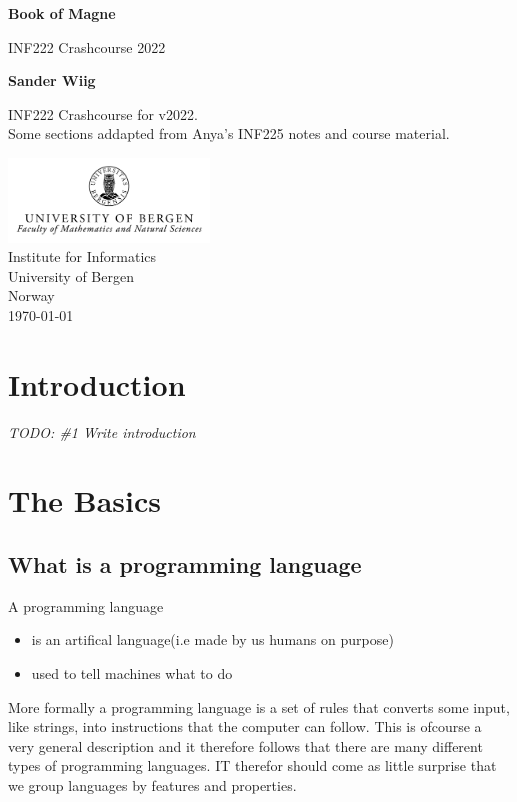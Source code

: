 \documentclass{article}
\DeclareRobustCommand{\comment}[1]{
    {\color{orange}\emph{#1}}
}
\begin{document}
    \begin{titlepage}
        \begin{center}
            \vspace*{1cm}
    
            \huge
            \textbf{Book of Magne}
    
            \vspace{0.5cm}
            \LARGE
            INF222 Crashcourse 2022
                
            \vspace{1.5cm}

            \textbf{Sander Wiig}
    
            \vfill
            
            \Large
            INF222 Crashcourse for v2022.\\
            Some sections addapted from Anya's INF225 notes and course material.
                
            \vspace{0.5cm}
        
            \includegraphics[width=0.4\textwidth]{UiBlogoMN_gray_m_Eng.png}\\
            \Large
            Institute for Informatics\\
            University of Bergen\\
            Norway\\
            \today
                
        \end{center}
    \end{titlepage}
    \newpage
    \tableofcontents
    \newpage
    \section{Introduction}
    \comment{TODO: \#1 Write introduction}
    \section{The Basics}
    \subsection{What is a programming language}
        A programming language 
        \begin{itemize}
            \item is an artifical language(i.e made by us humans on purpose)
            \item used to tell machines what to do
        \end{itemize}
        More formally a programming language is a set of rules that converts some input, like strings, into instructions that the computer 
        can follow.
        This is ofcourse a very general description and it therefore follows that there are many different types of programming languages.
        IT therefor should come as little surprise that we group languages by features and properties. 
\end{document}
